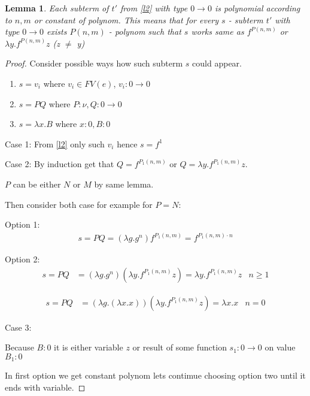 \documentclass[11pt]{article}
\newtheorem{lemma}[theorem]{Lemma}
\newcommand{\gl}{\lambda}
\newcommand{\too}{\rightarrow}
\begin{document}
\begin{lemma}
    Each subterm of \(t'\) from \cref{l2} with type \(0 \too 0\) is polynomial according to \(n, m\) or constant of polynom. This means
    that for every \(s\) - subterm \(t'\) with type \(0 \too 0\) exists \(P(n, m)\) - polynom such that \(s\) works same as 
    \(f^{P(n, m)}\) or \(\gl y. f^{P(n, m)} z\) (z \(\neq\) y)
\end{lemma} 

\begin{proof}
    Consider possible ways how such subterm \(s\) could appear. 

    \begin{enumerate}
        \item \(s = v_i\) where \(v_i \in FV(e)\), \(v_i : 0 \too 0\)
        \item \(s = P Q\) where \(P : \nu, Q : 0 \too 0\)
        \item \(s = \gl x. B\) where \(x : 0, B : 0\)
    \end{enumerate}



Case 1: From \cref*{l2} only such \(v_i\) hence \(s = f^1\)

\hfill \break

Case 2: By induction get that \(Q = f^{P_1(n, m)}\) or \(Q = \gl y. f^{P_1(n, m)} z\).

\(P\) can be either \(N\) or \(M\) by same lemma.

Then consider both case for example for \(P = N\):

Option 1:
\begin{align*}
    s = P Q = (\gl g.g^n) f^{P_1(n, m)} = f^{P_1(n, m) \cdot n}
\end{align*}

Option 2:
\begin{align*}
    s = P Q &= (\gl g.g^n) (\gl y. f^{P_1(n, m)} z) = \gl y. f^{P_1(n, m)} z & n \geq 1
\end{align*}

\begin{align*}
    s = P Q &= (\gl g.(\gl x.x)) (\gl y. f^{P_1(n, m)} z) = \gl x. x  & n = 0
\end{align*}

\hfill \break

Case 3:

Because \(B : 0\) it is either variable \(z\) or result of some function \(s_1 : 0 \too 0\)
on value \(B_1 : 0\)

In first option we get constant polynom lets contimue choosing option two until it ends with variable.


\end{proof}
\end{document}
